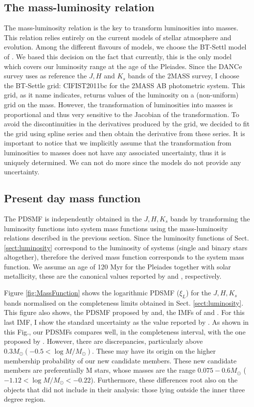 \subsection{The mass-luminosity relation}
\label{sect:mass-luminosity}
The mass-luminosity relation is the key to transform luminosities into masses. This relation relies entirely on the current models of stellar atmosphere and evolution. Among the different flavours of models, we choose the BT-Settl model of \citet{Allard2012}. We based this decision on the fact that currently, this is the only model which covers our luminosity range at the age of the Pleiades. Since the DANCe survey uses as reference the $J,H$ and $K_s$ bands of the 2MASS survey, I choose the BT-Settle grid: CIFIST2011bc for the 2MASS AB photometric system. This grid, as it name indicates, returns values of the luminosity on a (non-uniform) grid on the mass. However,  the transformation of luminosities into masses is proportional and thus very sensitive to the Jacobian of the transformation. To avoid the discontinuities in the derivatives produced by the grid, we decided to fit the grid using spline series and then obtain the derivative from these series. It is important to notice that we implicitly assume that the transformation from luminosities to masses does not have any associated uncertainty, thus it is uniquely determined. We can not do more since the models do not provide any uncertainty. 

\subsection{Present day mass function}

The PDSMF is independently obtained in the $J,H,K_s$ bands by transforming the luminosity functions into system mass functions using the mass-luminosity relations described in the previous section. Since the luminosity functions of Sect. \ref{sect:luminosity} correspond to the luminosity of systems (single and binary stars altogether), therefore the derived mass function corresponds to the system mass function. We assume an age of 120 Myr for the Pleiades together with solar metallicity, these are the canonical values reported by \citet{} and \citet{}, respectively.

Figure \ref{fig:MassFunction} shows the logarithmic PDSMF ($\xi_L$) for the $J,H,K_s$ bands normalised on the completeness limits obtained in Sect. \ref{sect:luminosity}. This figure also shows, the PDSMF proposed by  \citet{Bouy2015} and, the IMFs of \citet{Thies2007} and \citet{Chabrier2005}. For this last IMF, I show the standard uncertainty as the value reported by \citet{Chabrier2003}. As shown in this Fig., our PDSMFs compares well, in the completeness interval, with the one proposed by \citet{Bouy2015}. However, there are discrepancies, particularly above $0.3 M_{\odot} (-0.5 < \log M/M_{\odot})$. These may have its origin on the higher membership probability of our new candidate members. These new candidate members are preferentially M stars, whose masses are the range $0.075 - 0.6 M_{\odot}$ ($-1.12 < \log M/M_{\odot} < -0.22$). Furthermore, these differences root also on the objects that \citet{Bouy2015} did not include in their analysis: those lying outside the inner three degree region. 

